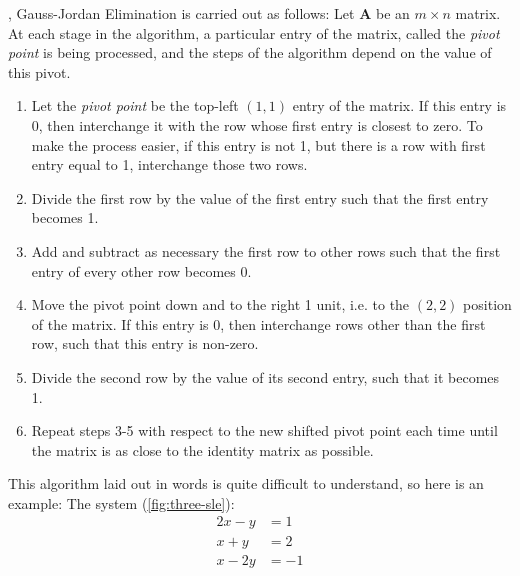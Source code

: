 \documentclass{tufte-book}
\begin{document}
, Gauss-Jordan Elimination is carried out as follows: Let \textbf{A} be an $m \times n$ matrix.
At each stage in the algorithm, a particular entry of the matrix, called the \emph{pivot point} is being processed,
and the steps of the algorithm depend on the value of this pivot.
\begin{enumerate}
	\item Let the \emph{pivot point} be the top-left $(1,1)$ entry of the matrix. If this entry is 0, then interchange it
	      with the row whose first entry is closest to zero. To make the process easier, if this entry is not 1, but
	      there is a row with first entry equal to 1, interchange those two rows.
	\item Divide the first row by the value of the first entry such that the first entry becomes 1.
	\item Add and subtract as necessary the first row to other rows such that the first entry of every other row becomes
	      0.
	\item Move the pivot point down and to the right 1 unit, i.e. to the $(2,2)$ position of the matrix. If this entry
	      is 0, then interchange rows other than the first row, such that this entry is non-zero.
	\item Divide the second row by the value of its second entry, such that it becomes 1.
	\item Repeat steps 3-5 with respect to the new shifted pivot point each time until the matrix is as close to the
	      identity matrix as possible.
\end{enumerate}
This algorithm laid out in words is quite difficult to understand, so here is an example: The system (\cref{fig:three-sle}):
\begin{align*}
	2x-y   & = 1  \\
	x + y  & = 2  \\
	x - 2y & = -1
\end{align*}
\begin{marginfigure}[-0cm]
	\caption{The plots of $2x-y=1, x+y=2$ and $x-2y=-1$.}
	\label{fig:three-sle}
\end{marginfigure}
\end{document}
